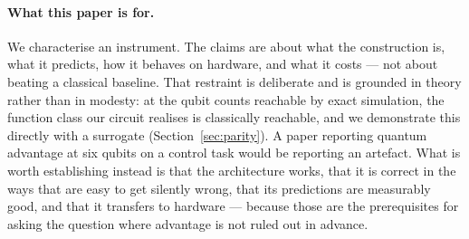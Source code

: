 \documentclass[11pt,onecolumn]{article}
\begin{document}
\paragraph{What this paper is for.}
We characterise an instrument. The claims are about what the
construction is, what it predicts, how it behaves on hardware, and what
it costs --- not about beating a classical baseline. That restraint is
deliberate and is grounded in theory rather than in modesty: at the
qubit counts reachable by exact simulation, the function class our
circuit realises is classically reachable, and we demonstrate this
directly with a surrogate (Section~\ref{sec:parity}). A paper reporting
quantum advantage at six qubits on a control task would be reporting an
artefact. What is worth establishing instead is that the architecture
works, that it is correct in the ways that are easy to get silently
wrong, that its predictions are measurably good, and that it transfers
to hardware --- because those are the prerequisites for asking the
question where advantage is not ruled out in advance.
\end{document}
